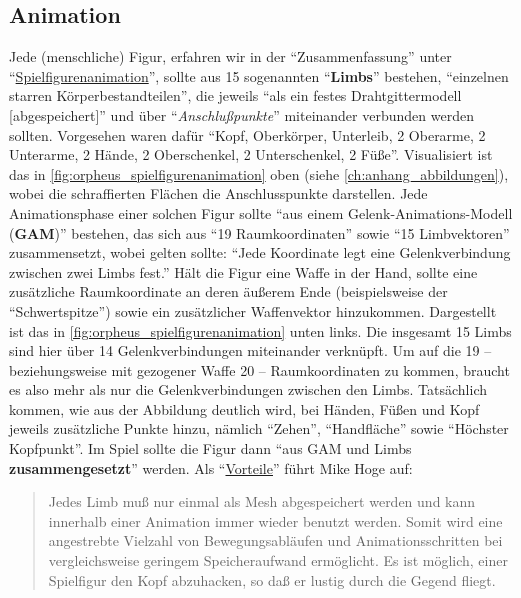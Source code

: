 \documentclass[a5paper,pagesize,numbers=noenddot]{scrbook}
\begin{document}
\subsection{Animation}\label{sec:orpheus_darstellung_animation}
Jede (menschliche) Figur, erfahren wir in der \enquote{Zusammenfassung} unter \enquote{\uline{Spiel\-figurenanimation}}, sollte aus 15 sogenannten \enquote{\textbf{Limbs}} bestehen, \enquote{einzelnen starren Körperbestandteilen}, die jeweils \enquote{als ein festes Drahtgittermodell [abgespeichert]} und über \enquote{\textit{Anschlußpunkte}} miteinander verbunden werden sollten.
Vorgesehen waren dafür \enquote{Kopf, Oberkörper, Unterleib, 2 Oberarme, 2 Unterarme, 2 Hände, 2 Oberschenkel, 2 Unterschenkel, 2 Füße}.
Visualisiert ist das in \autoref{fig:orpheus_spielfigurenanimation} oben (siehe \autoref{ch:anhang_abbildungen}), wobei die schraffierten Flächen die Anschlusspunkte darstellen.
Jede Animationsphase einer solchen Figur sollte \enquote{aus einem Gelenk-Animations-Modell (\textbf{GAM})} bestehen, das sich aus \enquote{19 Raumkoordinaten} sowie \enquote{15 Limbvektoren} zusammensetzt, wobei gelten sollte: \enquote{Jede Koordinate legt eine Gelenkverbindung zwischen zwei Limbs fest.}
Hält die Figur eine Waffe in der Hand, sollte eine zusätzliche Raumkoordinate an deren äußerem Ende (beispielsweise der \enquote{Schwertspitze}) sowie ein zusätzlicher Waffenvektor hinzukommen.
Dargestellt ist das in \autoref{fig:orpheus_spielfigurenanimation} unten links.
Die insgesamt 15 Limbs sind hier über 14 Gelenkverbindungen miteinander verknüpft.
Um auf die 19 -- beziehungsweise mit gezogener Waffe 20 -- Raumkoordinaten zu kommen, braucht es also mehr als nur die Gelenkverbindungen zwischen den Limbs.
Tatsächlich kommen, wie aus der Abbildung deutlich wird, bei Händen, Füßen und Kopf jeweils zusätzliche Punkte hinzu, nämlich \enquote{Zehen}, \enquote{Handfläche} sowie \enquote{Höchster Kopfpunkt}.
Im Spiel sollte die Figur dann \enquote{aus GAM und Limbs \textbf{zusammengesetzt}} werden.
Als \enquote{\uline{Vorteile}} führt Mike Hoge auf:

\begin{quote}
   Jedes Limb muß nur einmal als Mesh abgespeichert werden und kann innerhalb einer Animation immer wieder benutzt werden.
   Somit wird eine angestrebte Vielzahl von Bewegungsabläufen und Animationsschritten bei vergleichsweise geringem Speicheraufwand ermöglicht.
   Es ist möglich, einer Spielfigur den Kopf abzuhacken, so daß er lustig durch die Gegend fliegt.
\end{quote}
\end{document}
